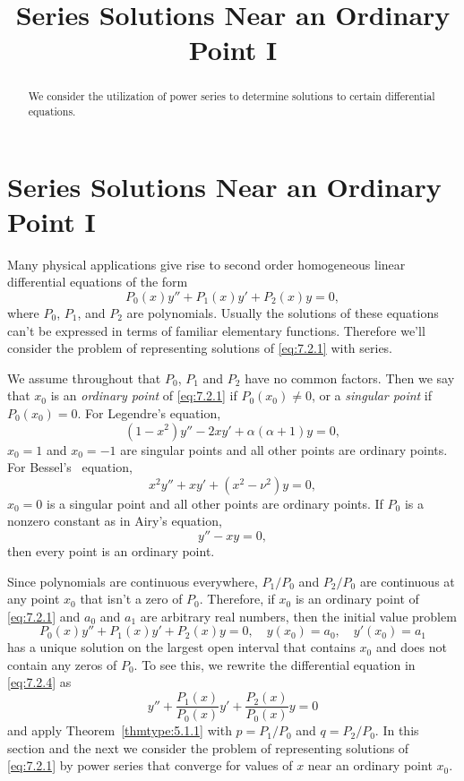 \documentclass{ximera}
\title{Series Solutions Near an Ordinary Point I}%
\begin{document}
\begin{abstract}
We consider the utilization of power series to determine solutions to certain differential equations.
\end{abstract}

\maketitle

\section*{Series Solutions Near an Ordinary Point I}

Many physical applications give rise to second order homogeneous
linear  differential equations of the form
\begin{equation}\label{eq:7.2.1}
P_0(x)y''+P_1(x)y'+P_2(x)y=0,
\end{equation}
where $P_0$, $P_1$, and $P_2$ are polynomials. Usually the solutions
of these equations can't be expressed in terms of familiar elementary
functions. Therefore we'll consider the problem of representing
solutions of \eqref{eq:7.2.1} with series.

We assume throughout that $P_0$, $P_1$ and $P_2$ have no common
factors. Then we say that $x_0$ is an \textit{ordinary point} of
\eqref{eq:7.2.1} if $P_0(x_0)\neq0$, or a \textit{singular point} if
$P_0(x_0)=0$. For  Legendre's equation,
\begin{equation}\label{eq:7.2.2}
(1-x^2)y''-2xy'+\alpha(\alpha+1)y=0,
\end{equation}
$x_0=1$ and $x_0=-1$ are singular points and all other points are
ordinary points. For  Bessel's~ equation,
$$
x^2y''+xy'+(x^2-\nu^2)y=0,
$$
$x_0=0$ is a singular point and all other points are ordinary points.
If $P_0$ is a nonzero constant as in  Airy's
equation,
\begin{equation}\label{eq:7.2.3}
y''-xy=0,
\end{equation}
then every point is an ordinary point.

Since polynomials are continuous everywhere, $P_1/P_0$ and $P_2/P_0$
are continuous at any point $x_0$ that isn't  a zero of $P_0$.
Therefore, if $x_0$ is an ordinary point of \eqref{eq:7.2.1} and $a_0$ and
$a_1$ are arbitrary real numbers, then the initial value problem
\begin{equation}\label{eq:7.2.4}
P_0(x)y''+P_1(x)y'+P_2(x)y=0, \quad  y(x_0)=a_0,\quad y'(x_0)=a_1
\end{equation}
has a unique solution on the largest open interval that contains $x_0$
and does not contain any zeros of $P_0$. To see this, we rewrite the
differential equation in \eqref{eq:7.2.4} as
$$
y''+\frac{P_1(x)}{P_0(x)}y'+\frac{P_2(x)}{P_0(x)}y=0
$$
and apply Theorem~\ref{thmtype:5.1.1} with $p=P_1/P_0$ and $q=P_2/P_0$.
In this section and the next we  consider the problem of
representing  solutions of \eqref{eq:7.2.1}  by power series that
converge  for values of $x$  near an ordinary point $x_0$.
\end{document}
